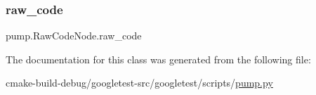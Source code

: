 \subsubsection{\texorpdfstring{raw\_code}{raw\_code}}
{\footnotesize\ttfamily pump.\+Raw\+Code\+Node.\+raw\+\_\+code}



The documentation for this class was generated from the following file\+:\begin{DoxyCompactItemize}
\item 
cmake-\/build-\/debug/googletest-\/src/googletest/scripts/\mbox{\hyperlink{pump_8py}{pump.\+py}}\end{DoxyCompactItemize}
